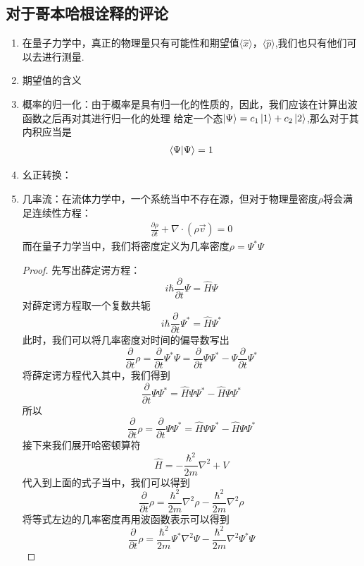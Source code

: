 \documentclass{article}
\begin{document}
\subsection{对于哥本哈根诠释的评论}
\begin{enumerate}
	\item 在量子力学中，真正的物理量只有可能性和期望值$\langle\hat{x}\rangle，\langle\hat{p}\rangle$,我们也只有他们可以去进行测量.
	\item 期望值的含义
	\item 概率的归一化：由于概率是具有归一化的性质的，因此，我们应该在计算出波函数之后再对其进行归一化的处理
	      给定一个态$\ket{\Psi}=c_1\ket{1}+c_2\ket{2}$,那么对于其内积应当是
	      \begin{align*}
		      \braket{\Psi}{\Psi}=1
	      \end{align*}
	\item 幺正转换：
	\item 几率流：在流体力学中，一个系统当中不存在源，但对于物理量密度$\rho$将会满足连续性方程：
	      \begin{align*}
		      \frac{\partial \rho}{\partial t}+\nabla\cdot(\rho\vec{v})=0
	      \end{align*}
	      而在量子力学当中，我们将密度定义为几率密度$\rho=\Psi^*\Psi$
	      \begin{proof}
		      先写出薛定谔方程：
		      \[
			      i\hbar\frac{\partial}{\partial t}\Psi=\hat{H}\Psi
		      \]
		      对薛定谔方程取一个复数共轭
		      \[
			      i\hbar\frac{\partial}{\partial t}\Psi^*=\hat{H}\Psi^*
		      \]
		      此时，我们可以将几率密度对时间的偏导数写出
		      \[
			      \frac{\partial}{\partial t}\rho=\frac{\partial}{\partial t}\Psi^*\Psi=\frac{\partial}{\partial t}\Psi\Psi^*-\Psi\frac{\partial}{\partial t}\Psi^*
		      \]
		      将薛定谔方程代入其中，我们得到
		      \[
			      \frac{\partial}{\partial t}\Psi\Psi^*=\hat{H}\Psi\Psi^*-\hat{H}\Psi\Psi^*
		      \]
		      所以
		      \[
			      \frac{\partial}{\partial t}\rho=\frac{\partial}{\partial t}\Psi\Psi^*=\hat{H}\Psi\Psi^*-\hat{H}\Psi\Psi^*
		      \]
		      接下来我们展开哈密顿算符
		      \[
			      \hat{H}=-\frac{\hbar^2}{2m}\nabla^2+V
		      \]
		      代入到上面的式子当中，我们可以得到
		      \[
			      \frac{\partial}{\partial t}\rho=\frac{\hbar^2}{2m}\nabla^2\rho-\frac{\hbar^2}{2m}\nabla^2\rho
		      \]
		      将等式左边的几率密度再用波函数表示可以得到
		      \[
			      \frac{\partial}{\partial t}\rho=\frac{\hbar^2}{2m}\Psi^*\nabla^2\Psi-\frac{\hbar^2}{2m}\nabla^2\Psi^*\Psi
		      \]
	      \end{proof}

\end{enumerate}
\end{document}
